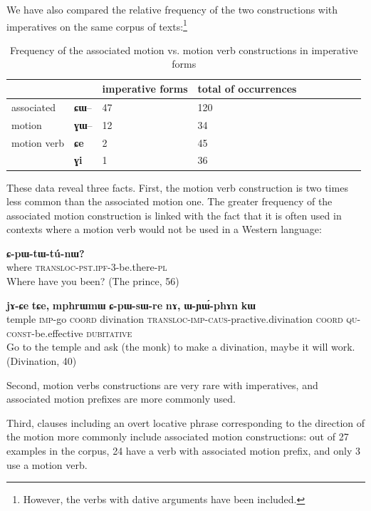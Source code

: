 \documentclass[oldfontcommands,twoside,a4paper,12pt]{article}
\newcommand{\ipa}[1]{{\phon\textbf{#1}}}
\newcommand{\imp}{\textsc{imp}}
\begin{document}
We have also compared the relative frequency of the two constructions with imperatives on the same corpus of texts:\footnote{However, the verbs with dative arguments have been included.}
\begin{table}[H]
\caption{Frequency of the associated motion vs. motion verb constructions in imperative forms} \label{tab:comparison.texts}
 
\begin{tabular}{llllllllll}
\toprule
&& imperative forms &total of occurrences \\
\midrule
 associated& \ipa{ɕɯ}-- & 47 & 120\\
motion & \ipa{ɣɯ}-- &  12 &34\\

 \midrule
motion verb &\ipa{ɕe} &2&45\\
& \ipa{ɣi} &1&36\\
\bottomrule
\end{tabular}  
\end{table}
These data reveal three facts. First, the motion verb construction is two times less common than the associated motion one. The greater frequency of the associated motion construction is linked with the fact that it is often used in contexts where a motion verb would not be used in a Western language:
  \begin{exe}
\ex \label{ex:tu}
\gll  \ipa{ŋotɕu}   	\ipa{ɕ-pɯ-tɯ-tú-nɯ?}   	\\
where \textsc{transloc}-\textsc{pst.ipf}-3-be.there-\textsc{pl} \\
\glt Where have you been? (The prince, 56)
   \end{exe}
  \begin{exe}
\ex \label{ex:sWru}
\gll  \ipa{rgɯnba}   	\ipa{jɤ-ɕe}   	\ipa{tɕe,}   	\ipa{mphrɯmɯ}   	\ipa{ɕ-pɯ-sɯ-re}   	\ipa{nɤ,}   	\ipa{ɯ-ɲɯ́-phɤn}   	\ipa{kɯ}    \\ 
temple \imp{}-go \textsc{coord} divination \textsc{transloc}-\textsc{imp}-\textsc{caus}-practive.divination \textsc{coord} \textsc{qu}-\textsc{const}-be.effective \textsc{dubitative}\\
\glt Go to the temple and ask (the monk) to make a divination, maybe it will work. (Divination, 40)
   \end{exe}

Second, motion verbs constructions are very rare with imperatives, and associated motion prefixes are more commonly used.
 
Third, clauses including an overt locative phrase corresponding to the direction of the motion more commonly include associated motion constructions: out of 27 examples in the corpus, 24 have a verb with associated motion prefix, and only 3 use a motion verb. 
\end{document}

